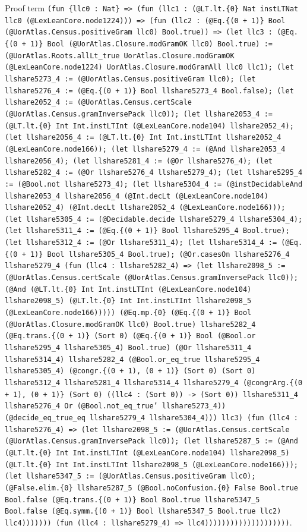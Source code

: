 \documentclass[11pt]{article}
\begin{document}
\noindent Proof term \texttt{(fun \{llc0 : Nat\} => (fun (llc1 : (@LT.lt.\{0\} Nat instLTNat llc0 (@LexLeanCore.node1224))) => (fun (llc2 : (@Eq.\{(0 + 1)\} Bool (@UorAtlas.Census.positiveGram llc0) Bool.true)) => (let llc3 : (@Eq.\{(0 + 1)\} Bool (@UorAtlas.Closure.modGramOK llc0) Bool.true) := (@UorAtlas.Roots.allLt\_true UorAtlas.Closure.modGramOK (@LexLeanCore.node1224) UorAtlas.Closure.modGramAll llc0 llc1); (let llshare5273\_4 := (@UorAtlas.Census.positiveGram llc0); (let llshare5276\_4 := (@Eq.\{(0 + 1)\} Bool llshare5273\_4 Bool.false); (let llshare2052\_4 := (@UorAtlas.Census.certScale (@UorAtlas.Census.gramInversePack llc0)); (let llshare2053\_4 := (@LT.lt.\{0\} Int Int.instLTInt (@LexLeanCore.node104) llshare2052\_4); (let llshare2056\_4 := (@LT.lt.\{0\} Int Int.instLTInt llshare2052\_4 (@LexLeanCore.node166)); (let llshare5279\_4 := (@And llshare2053\_4 llshare2056\_4); (let llshare5281\_4 := (@Or llshare5276\_4); (let llshare5282\_4 := (@Or llshare5276\_4 llshare5279\_4); (let llshare5295\_4 := (@Bool.not llshare5273\_4); (let llshare5304\_4 := (@instDecidableAnd llshare2053\_4 llshare2056\_4 (@Int.decLt (@LexLeanCore.node104) llshare2052\_4) (@Int.decLt llshare2052\_4 (@LexLeanCore.node166))); (let llshare5305\_4 := (@Decidable.decide llshare5279\_4 llshare5304\_4); (let llshare5311\_4 := (@Eq.\{(0 + 1)\} Bool llshare5295\_4 Bool.true); (let llshare5312\_4 := (@Or llshare5311\_4); (let llshare5314\_4 := (@Eq.\{(0 + 1)\} Bool llshare5305\_4 Bool.true); (@Or.casesOn llshare5276\_4 llshare5279\_4 (fun (llc4 : llshare5282\_4) => (let llshare2098\_5 := (@UorAtlas.Census.certScale (@UorAtlas.Census.gramInversePack llc0)); (@And (@LT.lt.\{0\} Int Int.instLTInt (@LexLeanCore.node104) llshare2098\_5) (@LT.lt.\{0\} Int Int.instLTInt llshare2098\_5 (@LexLeanCore.node166))))) (@Eq.mp.\{0\} (@Eq.\{(0 + 1)\} Bool (@UorAtlas.Closure.modGramOK llc0) Bool.true) llshare5282\_4 (@Eq.trans.\{(0 + 1)\} (Sort 0) (@Eq.\{(0 + 1)\} Bool (@Bool.or llshare5295\_4 llshare5305\_4) Bool.true) (@Or llshare5311\_4 llshare5314\_4) llshare5282\_4 (@Bool.or\_eq\_true llshare5295\_4 llshare5305\_4) (@congr.\{(0 + 1), (0 + 1)\} (Sort 0) (Sort 0) llshare5312\_4 llshare5281\_4 llshare5314\_4 llshare5279\_4 (@congrArg.\{(0 + 1), (0 + 1)\} (Sort 0) ((llc4 : (Sort 0)) -> (Sort 0)) llshare5311\_4 llshare5276\_4 Or (@Bool.not\_eq\_true' llshare5273\_4)) (@decide\_eq\_true\_eq llshare5279\_4 llshare5304\_4))) llc3) (fun (llc4 : llshare5276\_4) => (let llshare2098\_5 := (@UorAtlas.Census.certScale (@UorAtlas.Census.gramInversePack llc0)); (let llshare5287\_5 := (@And (@LT.lt.\{0\} Int Int.instLTInt (@LexLeanCore.node104) llshare2098\_5) (@LT.lt.\{0\} Int Int.instLTInt llshare2098\_5 (@LexLeanCore.node166))); (let llshare5347\_5 := (@UorAtlas.Census.positiveGram llc0); (@False.elim.\{0\} llshare5287\_5 (@Bool.noConfusion.\{0\} False Bool.true Bool.false (@Eq.trans.\{(0 + 1)\} Bool Bool.true llshare5347\_5 Bool.false (@Eq.symm.\{(0 + 1)\} Bool llshare5347\_5 Bool.true llc2) llc4))))))) (fun (llc4 : llshare5279\_4) => llc4))))))))))))))))))))}.\par
\end{document}
